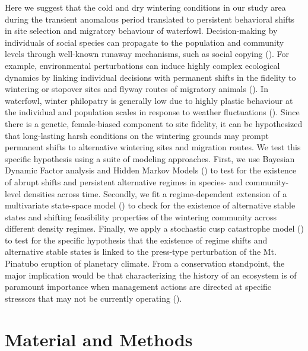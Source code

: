 \documentclass[12pt]{article}
\begin{document}
Here we suggest that the cold and dry wintering conditions in our study area during the transient anomalous period translated to persistent behavioral shifts in site selection and migratory behaviour of waterfowl. Decision-making by individuals of social species can propagate to the population and community levels through well-known runaway mechanisms, such as social copying (\cite{Oro2020a,Oro2023}). For example, environmental perturbations can induce highly complex ecological dynamics by linking individual decisions with permanent shifts in the fidelity to wintering or stopover sites and flyway routes of migratory animals (\cite{Almaraz2011,Almaraz2012,Oro2020a,Oro2023,Piersma2011}). In waterfowl, winter philopatry is generally low due to highly plastic behaviour at the individual and population scales in response to weather fluctuations (\cite{Robertson1999a,Adam2015,Clausen2018a,Fox2023}). Since there is a genetic, female-biased component to site fidelity, it can be hypothesized that long-lasting harsh conditions on the wintering grounds may prompt permanent shifts to alternative wintering sites and migration routes. We test this specific hypothesis using a suite of modeling approaches. First, we use Bayesian Dynamic Factor analysis and Hidden Markov Models (\cite{Almaraz2011,Ward2022}) to test for the existence of abrupt shifts and persistent alternative regimes in species- and community-level densities across time. Secondly, we fit a regime-dependent extension of a multivariate state-space model (\cite{Almaraz2012}) to check for the existence of alternative stable states and shifting feasibility properties of the wintering community across different density regimes. Finally, we apply a stochastic cusp catastrophe model (\cite{Cobb1985}) to test for the specific hypothesis that the existence of regime shifts and alternative stable states is linked to the press-type perturbation of the Mt. Pinatubo eruption of planetary climate. From a conservation standpoint, the major implication would be that characterizing the history of an ecosystem is of paramount importance when management actions are directed at specific stressors that may not be currently operating (\cite{Scheffer2009a,Scheffer2015a}). \\

\section*{Material and Methods}
\label{sec:Material and Methods}
\end{document}
